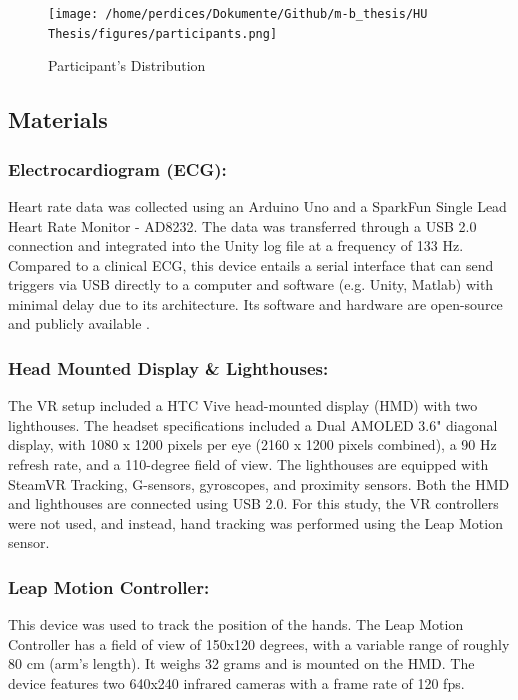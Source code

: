 \documentclass[12pt,oneside,openright]{report}
\begin{document}
\begin{figure}[h]
    \centering
    \texttt{[image: /home/perdices/Dokumente/Github/m-b\_thesis/HU Thesis/figures/participants.png]}
    \caption{Participant's Distribution}
    \label{fig:mesh1}
\end{figure}

    
\subsection*{Materials}

\subsubsection*{Electrocardiogram (ECG):}
Heart rate data was collected using an Arduino Uno and a SparkFun Single Lead Heart Rate Monitor - AD8232. The data was transferred through a USB 2.0 connection and integrated into the Unity log file at a frequency of 133 Hz. Compared to a clinical ECG, this device entails a serial interface that can send triggers via USB directly to a computer and software (e.g. Unity, Matlab) with minimal delay due to its architecture. Its software and hardware are open-source and publicly available \parencite{TimsECG}.

\subsubsection*{Head Mounted Display \& Lighthouses:}
The VR setup included a HTC Vive head-mounted display (HMD) with two lighthouses. The headset specifications included a Dual AMOLED 3.6" diagonal display, with 1080 x 1200 pixels per eye (2160 x 1200 pixels combined), a 90 Hz refresh rate, and a 110-degree field of view. The lighthouses are equipped with SteamVR Tracking, G-sensors, gyroscopes, and proximity sensors. Both the HMD and lighthouses are connected using USB 2.0. For this study, the VR controllers were not used, and instead, hand tracking was performed using the Leap Motion sensor.

\subsubsection*{Leap Motion Controller:}
This device was used to track the position of the hands. The Leap Motion Controller has a field of view of 150x120 degrees, with a variable range of roughly 80 cm (arm's length). It weighs 32 grams and is mounted on the HMD. The device features two 640x240 infrared cameras with a frame rate of 120 fps.
\end{document}
